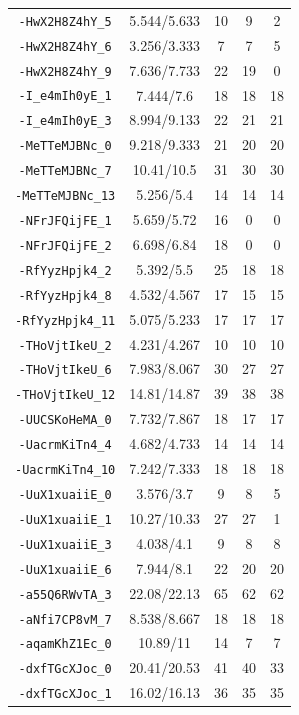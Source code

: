 \documentclass[bwprint]{gmcmthesis}
\begin{document}
\begin{longtable}{@{\extracolsep{\fill}}ccccc@{}}
\texttt{-HwX2H8Z4hY\_5} & 5.544/5.633 & 10 & 9 & 2 \\
\texttt{-HwX2H8Z4hY\_6} & 3.256/3.333 & 7 & 7 & 5 \\
\texttt{-HwX2H8Z4hY\_9} & 7.636/7.733 & 22 & 19 & 0 \\
\texttt{-I\_e4mIh0yE\_1} & 7.444/7.6 & 18 & 18 & 18 \\
\texttt{-I\_e4mIh0yE\_3} & 8.994/9.133 & 22 & 21 & 21 \\
\texttt{-MeTTeMJBNc\_0} & 9.218/9.333 & 21 & 20 & 20 \\
\texttt{-MeTTeMJBNc\_7} & 10.41/10.5 & 31 & 30 & 30 \\
\texttt{-MeTTeMJBNc\_13} & 5.256/5.4 & 14 & 14 & 14 \\
\texttt{-NFrJFQijFE\_1} & 5.659/5.72 & 16 & 0 & 0 \\
\texttt{-NFrJFQijFE\_2} & 6.698/6.84 & 18 & 0 & 0 \\
\texttt{-RfYyzHpjk4\_2} & 5.392/5.5 & 25 & 18 & 18 \\
\texttt{-RfYyzHpjk4\_8} & 4.532/4.567 & 17 & 15 & 15 \\
\texttt{-RfYyzHpjk4\_11} & 5.075/5.233 & 17 & 17 & 17 \\
\texttt{-THoVjtIkeU\_2} & 4.231/4.267 & 10 & 10 & 10 \\
\texttt{-THoVjtIkeU\_6} & 7.983/8.067 & 30 & 27 & 27 \\
\texttt{-THoVjtIkeU\_12} & 14.81/14.87 & 39 & 38 & 38 \\
\texttt{-UUCSKoHeMA\_0} & 7.732/7.867 & 18 & 17 & 17 \\
\texttt{-UacrmKiTn4\_4} & 4.682/4.733 & 14 & 14 & 14 \\
\texttt{-UacrmKiTn4\_10} & 7.242/7.333 & 18 & 18 & 18 \\
\texttt{-UuX1xuaiiE\_0} & 3.576/3.7 & 9 & 8 & 5 \\
\texttt{-UuX1xuaiiE\_1} & 10.27/10.33 & 27 & 27 & 1 \\
\texttt{-UuX1xuaiiE\_3} & 4.038/4.1 & 9 & 8 & 8 \\
\texttt{-UuX1xuaiiE\_6} & 7.944/8.1 & 22 & 20 & 20 \\
\texttt{-a55Q6RWvTA\_3} & 22.08/22.13 & 65 & 62 & 62 \\
\texttt{-aNfi7CP8vM\_7} & 8.538/8.667 & 18 & 18 & 18 \\
\texttt{-aqamKhZ1Ec\_0} & 10.89/11 & 14 & 7 & 7 \\
\texttt{-dxfTGcXJoc\_0} & 20.41/20.53 & 41 & 40 & 33 \\
\texttt{-dxfTGcXJoc\_1} & 16.02/16.13 & 36 & 35 & 35 \\

\end{longtable}
\end{document}
